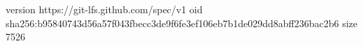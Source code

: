 version https://git-lfs.github.com/spec/v1
oid sha256:b95840743d56a57f043fbecc3de9f6fe3ef106eb7b1de029dd8abff236bac2b6
size 7526
